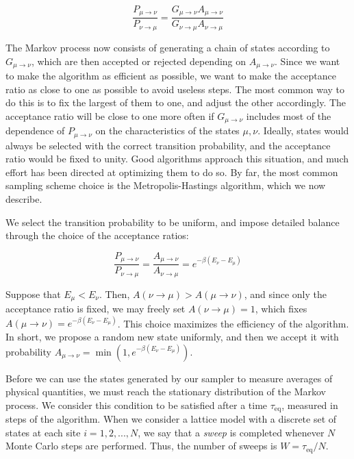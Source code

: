 \begin{equation}
\frac{P_{\mu\rightarrow\nu}}{P_{\nu\rightarrow\mu}}= \frac{G_{ \mu\rightarrow\nu} A_{\mu\rightarrow\nu}}{G_{ \nu\rightarrow\mu} A_{\nu\rightarrow\mu}}
\end{equation}

The Markov process now consists of generating a chain of states according to $G_{ \mu\rightarrow\nu}$, which are then accepted or rejected depending on $A_{\mu\rightarrow\nu}$.
Since we want to make the algorithm as efficient as possible, we want to make the acceptance ratio as close to one as possible to avoid useless steps.	
The most common way to do this is to fix the largest of them to one, and adjust the other accordingly.
The acceptance ratio will be close to one more often if $G_{ \mu\rightarrow\nu}$ includes most of the dependence of $P_{\mu\rightarrow\nu}$ on the characteristics of the states $\mu, \nu$.
Ideally, states would always be selected with the correct transition probability, and the acceptance ratio would be fixed to unity.
Good algorithms approach this situation, and much effort has been directed at optimizing them to do so.
By far, the most common sampling scheme choice is the Metropolis-Hastings algorithm, which we now  describe.

We select the transition probability to be uniform, and impose detailed balance through the choice of the acceptance ratios:

\begin{equation}
\frac{ P_{\mu\rightarrow\nu }}{ P_{\nu\rightarrow\mu }} = \frac{ A_{\mu\rightarrow\nu }}{ A_{\nu\rightarrow\mu } } = e^{-\beta ( E_\nu - E_\mu )}
\end{equation}

Suppose that $E_\mu < E_\nu $.
Then, $A ( \nu \rightarrow \mu ) > A ( \mu \rightarrow \nu ) $, and since only the acceptance ratio is fixed, we may freely set $A ( \nu \rightarrow \mu ) = 1$, which fixes $A ( \mu \rightarrow \nu ) = e^{-\beta ( E_\nu - E_\mu ) }$.
This choice maximizes the efficiency of the algorithm.
In short, we propose a random new state uniformly, and then we accept it with probability $A_{\mu\rightarrow \nu} = \min (1,  e^{-\beta ( E_\nu - E_\mu )})$.

Before we can use the states generated by our sampler to measure averages of physical quantities, we must reach the stationary distribution of the Markov process.
We consider this condition to be satisfied after a time $\tau_{\text{eq}}$, measured in steps of the algorithm.
When we consider a lattice model with a discrete set of states at each site $i = 1, 2, ..., N$, we say that a \emph{sweep} is completed whenever $N$ Monte Carlo steps are performed.
Thus, the number of  sweeps is $W = \tau_{\text{eq}} / N$.

